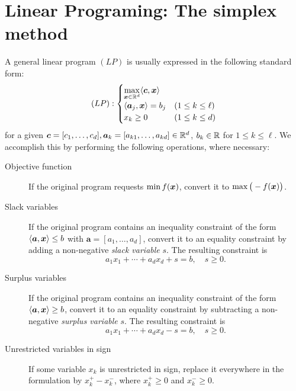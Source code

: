 
\section{Linear Programing: The simplex method}

A general linear program $(LP)$ is usually expressed in the following standard form:
\begin{equation*}
(LP): \begin{cases}
\displaystyle{\max_{\boldsymbol{x}\in \mathbb{R}^d} \langle \boldsymbol{c}, \boldsymbol{x}\rangle} \\
\langle \boldsymbol{a}_j, \boldsymbol{x} \rangle = b_j &(1 \leq k \leq \ell) \\
x_k \geq 0 &(1 \leq k \leq d) 
\end{cases}
\end{equation*}
for a given $\boldsymbol{c}=[c_1, \dotsc, c_d], \boldsymbol{a}_k = [a_{k1}, \dots, a_{kd} ] \in \mathbb{R}^d$, $b_k \in \mathbb{R}$ for $1 \leq k \leq \ell$.  We accomplish this by performing the following operations, where necessary:
\begin{description}
	\item[Objective function] If the original program requests $\min f(\boldsymbol{x})$, convert it to $\max \big( -f(\boldsymbol{x}) \big)$.
	\item [Slack variables] If the original program contains an inequality constraint of the form $\langle \boldsymbol{a}, \boldsymbol{x} \rangle \leq b$ with $\boldsymbol{a} = [a_1, \dotsc, a_d]$, convert it to an equality constraint by adding a non-negative \emph{slack variable} $s$. The resulting constraint is 
	\begin{equation*}
	a_1 x_1 + \dotsb + a_d x_d + s = b, \quad s \geq 0.
	\end{equation*}
	\item [Surplus variables] If the original program contains an inequality constraint of the form $\langle \boldsymbol{a}, \boldsymbol{x} \rangle \geq b$, convert it to an equality constraint by subtracting a non-negative \emph{surplus variable} $s$.  The resulting constraint is
	\begin{equation*}
	a_1 x_1 + \dotsb + a_d x_d - s = b, \quad s \geq 0.
	\end{equation*}
	\item[Unrestricted variables in sign] If some variable $x_k$ is unrestricted in sign, replace it everywhere in the formulation by $x_k^+ - x_k^-$, where $x_k^+ \geq 0$ and $x_k^- \geq 0$.
\end{description}

